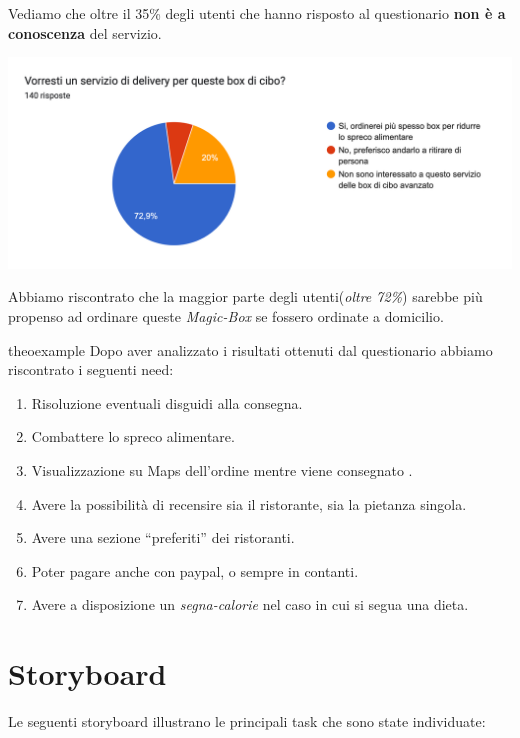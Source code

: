 \documentclass{article}
\begin{document}
Vediamo che oltre il 35\% degli utenti che hanno risposto al questionario \textbf{non è a conoscenza} del servizio.\par \vspace{1cm}
\includegraphics[width=\textwidth]{Data/Grafici/totg_delivery.png} \par
Abbiamo riscontrato che la maggior parte degli utenti(\textit{oltre 72\%}) sarebbe più propenso ad ordinare queste \textit{Magic-Box} se fossero ordinate a domicilio.
\begin{need}{}{theoexample}
    Dopo aver analizzato i risultati ottenuti dal questionario abbiamo riscontrato i seguenti need:
    \begin{enumerate}
        \item Risoluzione eventuali disguidi alla consegna.
        \item Combattere lo spreco alimentare.
        \item Visualizzazione su Maps dell'ordine mentre viene consegnato .
        \item Avere la possibilità di recensire sia il ristorante, sia la pietanza singola.
        \item Avere una sezione “preferiti” dei ristoranti.
        \item Poter pagare anche con paypal, o sempre in contanti.
        \item Avere a disposizione un \textit{segna-calorie} nel caso in cui si segua una dieta.
    \end{enumerate}
    \end{need}

    \vspace{1cm}
 \vspace{4cm}
\pagebreak
\section{Storyboard} \par
Le seguenti storyboard illustrano le principali task che sono state individuate:
\end{document}
